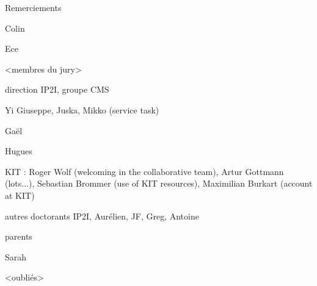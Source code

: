 Remerciements

Colin

Ece

<membres du jury>

direction IP2I, groupe CMS

Yi Giuseppe, Juska, Mikko (service task)

Gaël

Hugues

KIT : Roger Wolf (welcoming in the collaborative team), Artur Gottmann (lots...), Sebastian Brommer (use of KIT resources), Maximilian Burkart (account at KIT)

autres doctorants IP2I, Aurélien, JF, Greg, Antoine

parents

Sarah

<oubliés>
